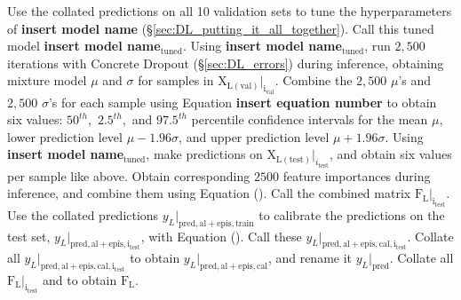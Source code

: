 \begin{algorithm}
\begin{algorithmic}[1]
\ENDFOR
\STATE Use the collated predictions on all 10 validation sets to tune the hyperparameters of \textbf{insert model name} (\S\ref{sec:DL_putting_it_all_together}). Call this tuned model \textbf{insert model name}$_\mathrm{tuned}$.
\STATE Using \textbf{insert model name}$_\mathrm{tuned}$, run $2,500$ iterations with Concrete Dropout (\S\ref{sec:DL_errors}) during inference, obtaining mixture model $\mu$ and $\sigma$ for samples in $\boldsymbol{\mathrm{X_{L(val)}}}\vert_\mathrm{i_\mathrm{val}}$.
\STATE Combine the $2,500$ $\mu$'s and $2,500$ $\sigma$'s for each sample using Equation \textbf{insert equation number} to obtain six values: $50^{th},$ $2.5^{th},$ and $97.5^{th}$ percentile confidence intervals for the mean $\mu$, lower prediction level $\mu - 1.96\sigma$, and upper prediction level $\mu + 1.96\sigma$.
\ENDFOR
\STATE Using \textbf{insert model name}$_\mathrm{tuned}$, make predictions on $\boldsymbol{\mathrm{X_{L(test)}}}\vert_{i_\mathrm{test}}$, and obtain six values per sample like above.
\STATE Obtain corresponding $2500$ feature importances during inference, and combine them using Equation (). Call the combined matrix $\boldsymbol{\mathrm{F_{L}}}\vert_{\mathrm{i_{test}}}$.
\STATE Use the collated predictions $y_{L}\vert_\mathrm{pred, al+epis, train}$ to calibrate the predictions on the test set, $y_{L}\vert_\mathrm{pred, al+epis, i_{test}}$, with Equation (). Call these $y_{L}\vert_\mathrm{pred, al+epis, cal, i_{test}}$.
\ENDFOR
\STATE Collate all $y_{L}\vert_\mathrm{pred, al+epis, cal, i_{test}}$ to obtain $y_{L}\vert_\mathrm{pred, al+epis, cal}$, and rename it $y_{L}\vert_\mathrm{pred}$.
\STATE Collate all $\boldsymbol{\mathrm{F_{L}}}\vert_{\mathrm{i_{test}}}$ and to obtain $\boldsymbol{\mathrm{F_{L}}}$.
\end{algorithmic} 
\end{algorithm}
